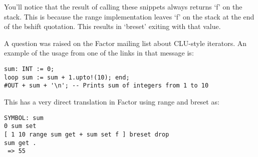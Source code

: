 You'll notice that the result of calling these snippets always returns
`f' on the stack. This is because the range implementation leaves `f'
on the stack at the end of the bshift quotation. This results in
`breset' exiting with that value.

A question was raised on the Factor mailing list about CLU-style
iterators. An example of the usage from one of the links in that
message is:


\begin{verbatim}
sum: INT := 0;
loop sum := sum + 1.upto!(10); end;
#OUT + sum + '\n'; -- Prints sum of integers from 1 to 10
\end{verbatim}


This has a very direct translation in Factor using range and breset
as:


\begin{verbatim}
SYMBOL: sum
0 sum set 
[ 1 10 range sum get + sum set f ] breset drop
sum get .
 => 55
\end{verbatim}

